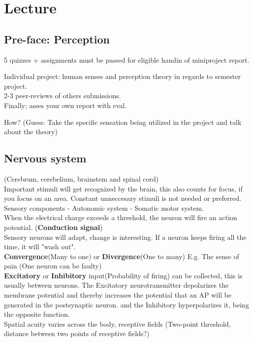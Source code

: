 \documentclass{article}
\begin{document}
\section{Lecture}
\subsection{Pre-face: Perception}
5 quizzes + assignments must be passed for eligible handin of miniproject report.

Individual project: human senses and perception theory in regards to semester project.\\
2-3 peer-reviews of others submissions.\\
Finally; asses your own report with eval.

How? (Guess: Take the specific sensation being utilized in the project and talk about the theory)

\subsection{Nervous system}
(Cerebrum, cerebelium, brainstem and spinal cord)\\
Important stimuli will get recognized by the brain, this also counts for focus, if you focus on an area. Constant unneccesary stimuli is not needed or preferred.\\
Sensory components - Autonomic system - Somatic motor system.\medskip\\
When the electrical charge exceeds a threshold, the neuron will fire an action potential. (\textbf{Conduction signal})\\
Sensory neurons will adapt, change is interesting. If a neuron keeps firing all the time, it will "wash out".\medskip \\
\textbf{Convergence}(Many to one) or \textbf{Divergence}(One to many) E.g. The sense of pain (One neuron can be faulty)\medskip\\
\textbf{Excitatory} or \textbf{Inhibitory} input(Probability of firing) can be collected, this is usually between neurons. The Excitatory neurotransmitter depolarizes the membrane potential and thereby increases the potential that an AP will be generated in the postsynaptic neuron. and the Inhibitory hyperpolarizes it, being the opposite function.\\

Spatial acuity varies across the body, receptive fields (Two-point threshold, distance between two points of receptive fields?)\\
\end{document}
